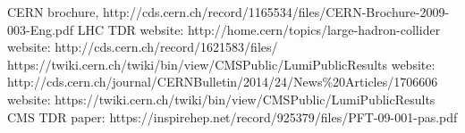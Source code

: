 \begin{thebibliography}{1}
 CERN brochure, http://cds.cern.ch/record/1165534/files/CERN-Brochure-2009-003-Eng.pdf
 LHC TDR
 website: http://home.cern/topics/large-hadron-collider
 website: http://cds.cern.ch/record/1621583/files/
 https://twiki.cern.ch/twiki/bin/view/CMSPublic/LumiPublicResults 
 website: http://cds.cern.ch/journal/CERNBulletin/2014/24/News\%20Articles/1706606
 website: https://twiki.cern.ch/twiki/bin/view/CMSPublic/LumiPublicResults
 CMS TDR
 paper: https://inspirehep.net/record/925379/files/PFT-09-001-pas.pdf




\end{thebibliography}
